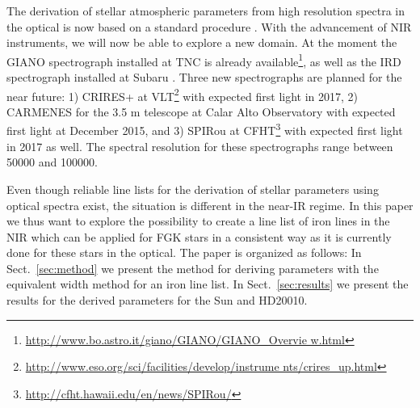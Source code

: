 \documentclass{aa}
\begin{document}
The derivation of stellar atmospheric parameters from high resolution spectra in
the optical is now based on a standard procedure \citep[see e.g.][]{Valenti2005,Sousa2008a}.
With the advancement of NIR instruments, we will now be able to explore a new
domain. At the moment the GIANO spectrograph installed at TNC is already
available\footnote{\url{http://www.bo.astro.it/giano/GIANO/GIANO_Overvie
w.html}}, as well as the IRD spectrograph installed
at Subaru \citep{IRD}. Three new spectrographs
are planned for the near future: 1) CRIRES+ at
VLT\footnote{\url{http://www.eso.org/sci/facilities/develop/instrume
nts/crires_up.html}} with expected first light in 2017, 2) CARMENES for the 3.5
m telescope at Calar Alto Observatory \citep{CARMENES} with expected first light
at December 2015, and 3) SPIRou at CFHT\footnote{\url{http://cfht.hawaii.edu/en/news/SPIRou/}} with expected first
light in 2017 as well. The spectral resolution for these spectrographs range
between 50000 and 100000.

Even though reliable line lists for the derivation of stellar
parameters using optical spectra exist, the situation is different
in the near-IR regime. In this paper we thus want to explore the
possibility to create a line list of iron lines in the NIR which
can be applied for FGK stars in a consistent way as it is currently
done for these stars in the optical. The paper is organized as
follows: In Sect.~\ref{sec:method} we present the method for deriving
parameters with the equivalent width method for an iron line list.
In Sect.~\ref{sec:results} we present the results for the derived
parameters for the Sun and HD20010.
\end{document}
